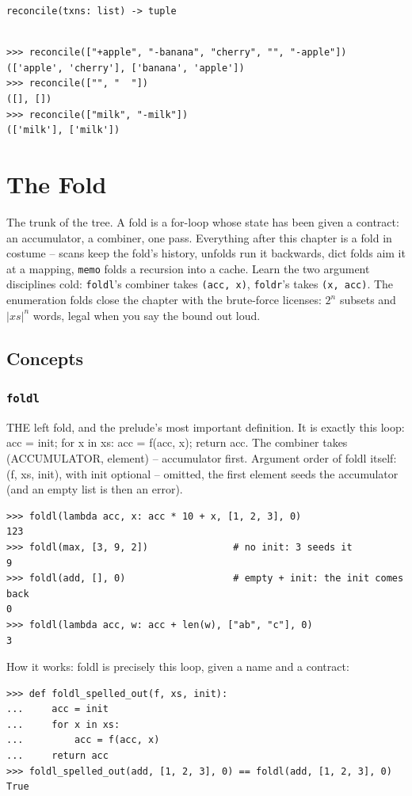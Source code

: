 \documentclass[10pt,letterpaper]{book}
\begin{document}
\noindent\texttt{reconcile(txns: list) -> tuple}
\begin{lstlisting}[style=ex]

>>> reconcile(["+apple", "-banana", "cherry", "", "-apple"])
(['apple', 'cherry'], ['banana', 'apple'])
>>> reconcile(["", "  "])
([], [])
>>> reconcile(["milk", "-milk"])
(['milk'], ['milk'])

\end{lstlisting}
\clearpage
\chapter{The Fold}

The trunk of the tree. A fold is a for-loop whose state has been given a
contract: an accumulator, a combiner, one pass. Everything after this chapter
is a fold in costume -- scans keep the fold's history, unfolds run it
backwards, dict folds aim it at a mapping, \texttt{memo} folds a recursion
into a cache. Learn the two argument disciplines cold: \texttt{foldl}'s
combiner takes \texttt{(acc, x)}, \texttt{foldr}'s takes \texttt{(x, acc)}.
The enumeration folds close the chapter with the brute-force licenses:
$2^n$ subsets and $|xs|^n$ words, legal when you say the bound out loud.
\section{Concepts}
\subsection{\texttt{foldl}}\label{def:foldl}
THE left fold, and the prelude's most important definition. It is exactly this loop: acc = init; for x in xs: acc = f(acc, x); return acc. The combiner takes (ACCUMULATOR, element) -- accumulator first. Argument order of foldl itself: (f, xs, init), with init optional -- omitted, the first element seeds the accumulator (and an empty list is then an error).
\begin{lstlisting}[style=ex]
>>> foldl(lambda acc, x: acc * 10 + x, [1, 2, 3], 0)
123
>>> foldl(max, [3, 9, 2])               # no init: 3 seeds it
9
>>> foldl(add, [], 0)                   # empty + init: the init comes back
0
>>> foldl(lambda acc, w: acc + len(w), ["ab", "c"], 0)
3
\end{lstlisting}

How it works: foldl is precisely this loop, given a name and a contract:

\begin{lstlisting}[style=ex]
>>> def foldl_spelled_out(f, xs, init):
...     acc = init
...     for x in xs:
...         acc = f(acc, x)
...     return acc
>>> foldl_spelled_out(add, [1, 2, 3], 0) == foldl(add, [1, 2, 3], 0)
True
\end{lstlisting}
\end{document}
